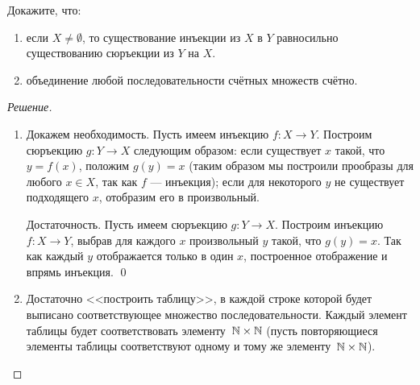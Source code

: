     \begin{problem}[3]
        Докажите, что:
        \begin{enumerate}[label=(\alph{*})]
            \item если \(X \neq \emptyset\), то существование инъекции из \(X\) в \(Y\) равносильно существованию сюръекции из \(Y\) на \(X\).
            \item объединение любой последовательности счётных множеств счётно.
        \end{enumerate}
    \end{problem}
    \begin{proof}[Решение]
        \begin{enumerate}[label=(\alph{*})]
            \item Докажем необходимость. Пусть имеем инъекцию \(f \colon X \to Y\). Построим сюръекцию \(g \colon Y \to X\) следующим образом: если существует \(x\) такой, что \(y = f(x)\), положим \(g(y) = x\) (таким образом мы построили прообразы для любого \(x \in X\), так как \(f\) --- инъекция); если для некоторого \(y\) не существует подходящего \(x\), отобразим его в произвольный.
            
            Достаточность. Пусть имеем сюръекцию \(g \colon Y \to X\). Построим инъекцию \(f \colon X \to Y\), выбрав для каждого \(x\) произвольный \(y\) такой, что  \(g(y) = x\). Так как каждый \(y\) отображается только в один \(x\), построенное отображение и впрямь инъекция. \qed
            \item Достаточно <<построить таблицу>>, в каждой строке которой будет выписано соответствующее множество последовательности. Каждый элемент таблицы будет соответствовать элементу~\(\mathbb{N} \times \mathbb{N}\) (пусть повторяющиеся элементы таблицы соответствуют одному и тому же элементу~\(\mathbb{N} \times \mathbb{N}\)).
        \end{enumerate}
    \end{proof}

